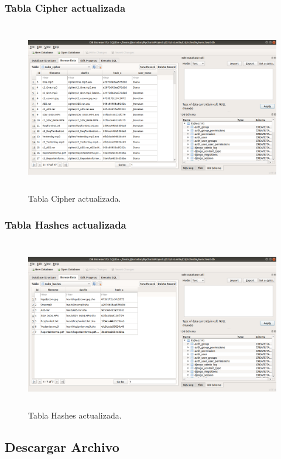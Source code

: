 \subsubsection{Tabla Cipher actualizada}

			\begin{figure}[H]
			\centering
			\includegraphics[width=14cm, height=7.5cm]{./images/Implementacion/CipherActualizada.png}
			\caption{Tabla Cipher actualizada.}
			\label{fig:6-1-29} 
			\end{figure}

\subsubsection{Tabla Hashes actualizada}

			\begin{figure}[H]
			\centering
			\includegraphics[width=14cm, height=7.5cm]{./images/Implementacion/HashesActualizada.png}
			\caption{Tabla Hashes actualizada.}
			\label{fig:6-1-30} 
			\end{figure}

\subsection{Descargar Archivo}

